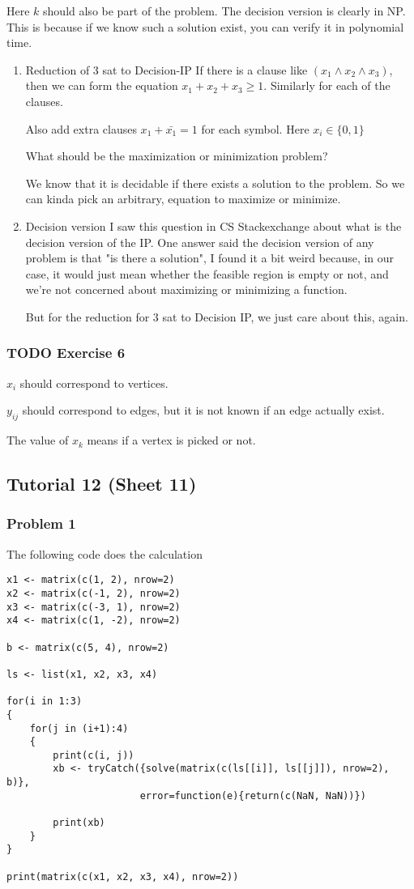 \documentclass[11pt]{article}
\begin{document}
Here \(k\) should also be part of the problem. The decision version is clearly
in NP. This is because if we know such a solution exist, you can verify it
in polynomial time.
\begin{enumerate}
\item Reduction of 3 sat to Decision-IP
\label{sec:orge8b6529}
If there is a clause like \((x_1 \wedge x_2 \wedge x_3)\), then we can form
the equation \(x_1 + x_2 + x_3 \ge 1\). Similarly for each of the clauses.

Also add extra clauses \(x_1 + \bar{x_1} = 1\) for each symbol. Here \(x_i \in \{0, 1\}\)

What should be the maximization or minimization problem?

We know that it is decidable if there exists a solution to the problem. So
we can kinda pick an arbitrary, equation to maximize or minimize.
\item Decision version
\label{sec:orgcb4e657}
I saw this question in CS Stackexchange about what is the decision version
of the IP. One answer said the decision version of any problem is that "is
there a solution", I found it a bit weird because, in our case, it would
just mean whether the feasible region is empty or not, and we're not
concerned about maximizing or minimizing a function.

But for the reduction for \(3\) sat to Decision IP, we just care about this,
again.
\end{enumerate}
\subsubsection{{\bfseries\sffamily TODO} Exercise 6}
\label{sec:org53f0a9b}
\(x_i\) should correspond to vertices.

\(y_{ij}\) should correspond to edges, but it is not known if an edge actually
exist.

The value of \(x_k\) means if a vertex is picked or not.
\subsection{Tutorial 12 (Sheet 11)}
\label{sec:orgb4a9edd}
\subsubsection{Problem 1}
\label{sec:org2855695}
The following code does the calculation

\begin{verbatim}
x1 <- matrix(c(1, 2), nrow=2)
x2 <- matrix(c(-1, 2), nrow=2)
x3 <- matrix(c(-3, 1), nrow=2)
x4 <- matrix(c(1, -2), nrow=2)

b <- matrix(c(5, 4), nrow=2)

ls <- list(x1, x2, x3, x4)

for(i in 1:3)
{
    for(j in (i+1):4)
    {
        print(c(i, j))
        xb <- tryCatch({solve(matrix(c(ls[[i]], ls[[j]]), nrow=2), b)},
                       error=function(e){return(c(NaN, NaN))})

        print(xb)
    }
}

print(matrix(c(x1, x2, x3, x4), nrow=2))
\end{verbatim}
\end{document}
